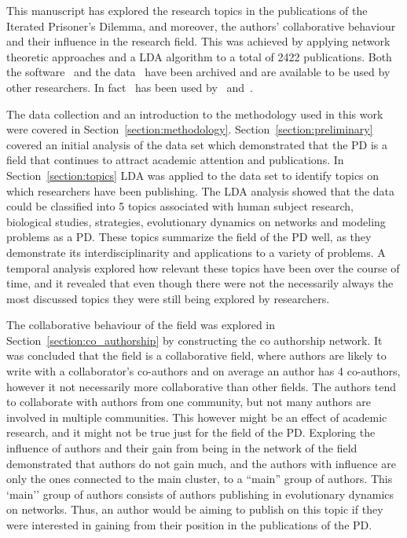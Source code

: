 \documentclass{article}
\theoremstyle{definition}
\begin{document}
This manuscript has explored the research topics in the publications of the
Iterated Prisoner's Dilemma, and moreover, the authors' collaborative behaviour
and their influence in the research field. This was achieved by
applying network theoretic approaches and a LDA algorithm to a total of 2422
publications. Both the software~\cite{nikoleta_2017} and the data~\cite{nikoleta_2017}
have been archived and are available to be used by other researchers. In
fact~\cite{nikoleta_2017} has been used by~\cite{brane} and~\cite{arcas_blog}.

The data collection and an introduction to the methodology used in this work
were covered in Section~\ref{section:methodology}.
Section~\ref{section:preliminary} covered an initial analysis of the data set
which demonstrated that the PD is a field that continues to attract academic
attention and publications. In Section~\ref{section:topics} LDA was
applied to the data set to identify topics on which researchers have been
publishing. The LDA analysis showed that the data could be classified into 5
topics associated with human subject research, biological studies, strategies,
evolutionary dynamics on networks and modeling
problems as a PD. These topics summarize the field of the PD well, as they
demonstrate its interdisciplinarity and applications to a variety of problems. A
temporal analysis explored how relevant these topics have been over the course
of time, and it revealed that even though there were not the necessarily always
the most discussed topics they were still being explored by researchers.

The collaborative behaviour of the field was explored in
Section~\ref{section:co_authorship} by constructing the co authorship network.
It was concluded that the field is a collaborative field, where authors are
likely to write with a collaborator's co-authors and on average an author has 4
co-authors, however it not necessarily more collaborative than other fields. The
authors tend to collaborate with authors from one community, but not many
authors are involved in multiple communities. This however
might be an effect of academic research, and it might not be true just for the
field of the PD. Exploring the influence of authors and their gain from being in
the network of the field demonstrated that authors do not gain much, and the
authors with influence are only the ones connected to the main cluster, to a
``main'' group of authors. This `main'' group of authors consists of authors
publishing in evolutionary dynamics on networks. Thus, an author would be aiming
to publish on this topic if they were interested in gaining from their position
in the publications of the PD.
\end{document}
